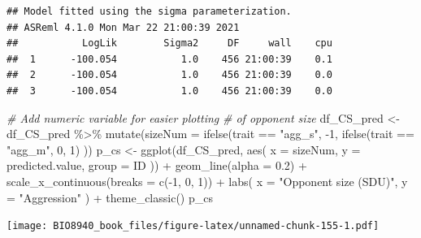 \documentclass[
  12pt,
]{book}
\newenvironment{Shaded}{\begin{snugshade}}{\end{snugshade}}
\newcommand{\AttributeTok}[1]{\textcolor[rgb]{0.77,0.63,0.00}{#1}}
\newcommand{\CommentTok}[1]{\textcolor[rgb]{0.56,0.35,0.01}{\textit{#1}}}
\newcommand{\DecValTok}[1]{\textcolor[rgb]{0.00,0.00,0.81}{#1}}
\newcommand{\FloatTok}[1]{\textcolor[rgb]{0.00,0.00,0.81}{#1}}
\newcommand{\FunctionTok}[1]{\textcolor[rgb]{0.00,0.00,0.00}{#1}}
\newcommand{\NormalTok}[1]{#1}
\newcommand{\OtherTok}[1]{\textcolor[rgb]{0.56,0.35,0.01}{#1}}
\newcommand{\SpecialCharTok}[1]{\textcolor[rgb]{0.00,0.00,0.00}{#1}}
\newcommand{\StringTok}[1]{\textcolor[rgb]{0.31,0.60,0.02}{#1}}
\begin{document}
\begin{verbatim}
## Model fitted using the sigma parameterization.
## ASReml 4.1.0 Mon Mar 22 21:00:39 2021
##           LogLik        Sigma2     DF     wall    cpu
##  1      -100.054           1.0    456 21:00:39    0.1
##  2      -100.054           1.0    456 21:00:39    0.0
##  3      -100.054           1.0    456 21:00:39    0.0
\end{verbatim}

\begin{Shaded}
\begin{Highlighting}[]
\CommentTok{\# Add numeric variable for easier plotting}
\CommentTok{\# of opponent size}
\NormalTok{df\_CS\_pred }\OtherTok{\textless{}{-}}\NormalTok{ df\_CS\_pred }\SpecialCharTok{\%\textgreater{}\%}
  \FunctionTok{mutate}\NormalTok{(}\AttributeTok{sizeNum =} \FunctionTok{ifelse}\NormalTok{(trait }\SpecialCharTok{==} \StringTok{"agg\_s"}\NormalTok{, }\SpecialCharTok{{-}}\DecValTok{1}\NormalTok{,}
    \FunctionTok{ifelse}\NormalTok{(trait }\SpecialCharTok{==} \StringTok{"agg\_m"}\NormalTok{, }\DecValTok{0}\NormalTok{, }\DecValTok{1}\NormalTok{)}
\NormalTok{  ))}
\NormalTok{p\_cs }\OtherTok{\textless{}{-}} \FunctionTok{ggplot}\NormalTok{(df\_CS\_pred, }\FunctionTok{aes}\NormalTok{(}
  \AttributeTok{x =}\NormalTok{ sizeNum,}
  \AttributeTok{y =}\NormalTok{ predicted.value,}
  \AttributeTok{group =}\NormalTok{ ID}
\NormalTok{)) }\SpecialCharTok{+}
  \FunctionTok{geom\_line}\NormalTok{(}\AttributeTok{alpha =} \FloatTok{0.2}\NormalTok{) }\SpecialCharTok{+}
  \FunctionTok{scale\_x\_continuous}\NormalTok{(}\AttributeTok{breaks =} \FunctionTok{c}\NormalTok{(}\SpecialCharTok{{-}}\DecValTok{1}\NormalTok{, }\DecValTok{0}\NormalTok{, }\DecValTok{1}\NormalTok{)) }\SpecialCharTok{+}
  \FunctionTok{labs}\NormalTok{(}
    \AttributeTok{x =} \StringTok{"Opponent size (SDU)"}\NormalTok{,}
    \AttributeTok{y =} \StringTok{"Aggression"}
\NormalTok{  ) }\SpecialCharTok{+}
  \FunctionTok{theme\_classic}\NormalTok{()}
\NormalTok{p\_cs}
\end{Highlighting}
\end{Shaded}

\texttt{[image: BIO8940\_book\_files/figure-latex/unnamed-chunk-155-1.pdf]}
\end{document}
